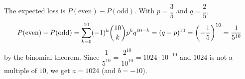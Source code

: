 The expected loss is $P(\text{even})-P(\text{odd})$. With $p=\dfrac35$ and $q=\dfrac25$,
\[P(\text{even})-P(\text{odd})=\sum_{k=0}^{10}(-1)^k\dbinom{10}{k}p^kq^{10-k}=(q-p)^{10}=\left(-\dfrac15\right)^{10}=\dfrac{1}{5^{10}}\]
by the binomial theorem. Since $\dfrac{1}{5^{10}}=\dfrac{2^{10}}{10^{10}}=1024\cdot10^{-10}$ and $1024$ is not a multiple of $10$, we get $a=\boxed{1024}$ (and $b=-10$).
